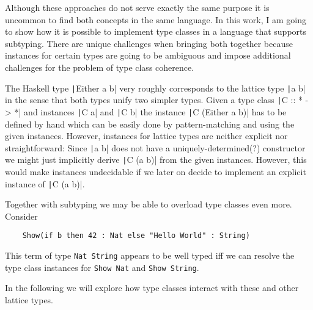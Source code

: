 Although these approaches do not serve exactly the same purpose it is uncommon to find both concepts in the same language.
In this work, I am going to show how it is possible to implement type classes in a language that supports subtyping.
There are unique challenges when bringing both together because instances for certain types are going to be ambiguous and impose additional challenges for the problem of type class coherence.

The Haskell type \texttt|Either a b| very roughly corresponds to the lattice type \texttt|a \/ b|  in the sense that both types unify two simpler types.
Given a type class \texttt|C :: * -> *| and instances \texttt|C a| and \texttt|C b| the instance \texttt|C (Either a b)| has to be defined by hand which can be easily done by pattern-matching and using the given instances.
However, instances for lattice types are neither explicit nor straightforward:
Since \texttt|a \/ b| does not have a uniquely-determined(?) constructor we might just implicitly derive \texttt|C (a \/ b)| from the given instances.
However, this would make instances undecidable if we later on decide to implement an explicit instance of \texttt|C (a \/ b)|.

Together with subtyping we may be able to overload type classes even more.
Consider
\begin{verbatim}
    Show(if b then 42 : Nat else "Hello World" : String)
\end{verbatim}
This term of type \texttt{Nat \/ String} appears to be well typed iff we can resolve the type class instances for \texttt{Show Nat} and \texttt{Show String}.

In the following we will explore how type classes interact with these and other lattice types.

